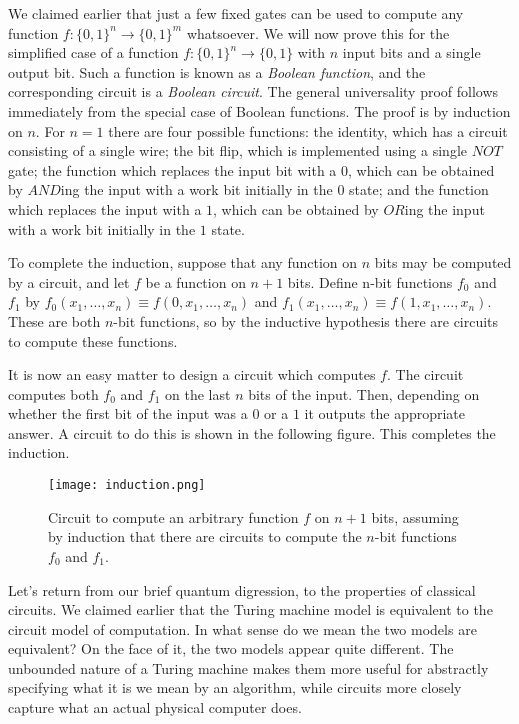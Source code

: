 We claimed earlier that just a few fixed gates can be used to compute any function $f : \{0, 1\}^n \rightarrow \{0, 1\}^m$ whatsoever. We will now prove this for the simplified case of a function $f : \{0, 1\}^n \rightarrow \{0, 1\}$ with $n$ input bits and a single output bit. Such a function is known as a \textit{Boolean function}, and the corresponding circuit is a \textit{Boolean circuit}. The general universality proof follows immediately from the special case of Boolean functions. The proof is by induction on $n$. For $n = 1$ there are four possible functions: the identity, which has a circuit consisting of a single wire; the bit flip, which is implemented using a single $NOT$ gate; the function which replaces the input bit with a $0$, which can be obtained by $AND$ing the input with a work bit initially in the $0$ state; and the function which replaces the input with a $1$, which can be obtained by $OR$ing the input with a work bit initially in the $1$ state.
\vspace{1em}

To complete the induction, suppose that any function on $n$ bits may be computed by a circuit, and let $f$ be a function on $n + 1$ bits. Define n-bit functions $f_0$ and $f_1$ by $f_0(x_1,\dots,x_n) \equiv f(0,x_1,\dots,x_n)$ and $f_1(x_1,\dots,x_n) \equiv f(1,x_1,\dots,x_n)$. These are both $n$-bit functions, so by the inductive hypothesis there are circuits to compute these functions.
\vspace{1em}

It is now an easy matter to design a circuit which computes $f$. The circuit computes both $f_0$ and $f_1$ on the last $n$ bits of the input. Then, depending on whether the first bit of the input was a $0$ or a $1$ it outputs the appropriate answer. A circuit to do this is shown in the following figure. This completes the induction.
\begin{figure}[h]
    \centering
    \texttt{[image: induction.png]}
    \caption{Circuit to compute an arbitrary function $f$ on $n + 1$ bits, assuming by induction that there are circuits to compute the $n$-bit functions $f_0$ and $f_1$.}
\end{figure}

\newpage
Let’s return from our brief quantum digression, to the properties of classical circuits. We claimed earlier that the Turing machine model is equivalent to the circuit model of computation. In what sense do we mean the two models are equivalent? On the face of it, the two models appear quite different. The unbounded nature of a Turing machine makes them more useful for abstractly specifying what it is we mean by an algorithm, while circuits more closely capture what an actual physical computer does.
\vspace{1em}

